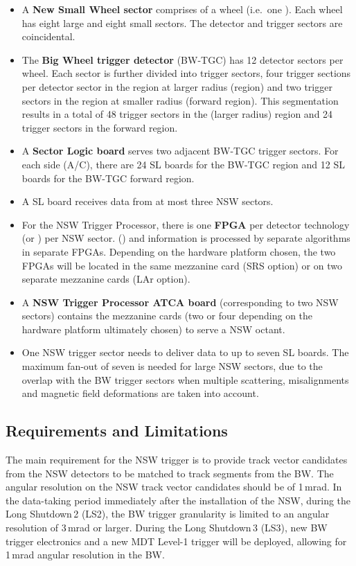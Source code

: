 \begin{itemize}
\item A {\bf New Small Wheel sector} comprises \sector of a wheel (i.e.\ one \endcap). Each wheel has eight large and eight small sectors. The detector and trigger sectors are coincidental.
\item The {\bf Big Wheel trigger detector} (BW-TGC) has 12 detector sectors per wheel.
Each sector is further divided into trigger sectors, four trigger sections per detector sector in the region at larger radius (\endcap region) and two trigger sectors in the region at smaller radius (forward region). This segmentation results in a total of 48 trigger sectors in the \endcap (larger radius) region and 24 trigger sectors in the forward region.
\item A {\bf Sector Logic board} serves two adjacent BW-TGC trigger sectors. For each side (A/C), there are 24 SL boards for the BW-TGC \endcap region and 12 SL boards for the BW-TGC forward region.
\item A SL board receives data from at most three NSW sectors.
\item For the NSW Trigger Processor, there is one {\bf FPGA} per detector technology (\MM or \stgc) per NSW sector. (\MM) and \stgc information is processed by separate algorithms in separate FPGAs. Depending on the hardware platform chosen, the two FPGAs will be located in the same mezzanine card (SRS option) or on two separate mezzanine cards (LAr option).
\item A {\bf NSW Trigger Processor ATCA board} (corresponding to two NSW sectors) contains the mezzanine cards (two or four depending on the hardware platform ultimately chosen) to serve a NSW octant.
\item One NSW trigger sector needs to deliver data to up to seven SL boards. The maximum fan-out of seven is needed for large NSW sectors, due to the overlap with the BW trigger sectors when multiple scattering, misalignments and magnetic field deformations are taken into account.
\end{itemize}


\subsection{Requirements and Limitations}
\label{sec:RequirementLimitations}

The main requirement for the NSW trigger is to provide track vector candidates from the NSW detectors to be matched to track segments from the BW.
The angular resolution on the NSW track vector candidates should be of 1\,mrad. In the data-taking period immediately after the installation of the NSW, during the Long Shutdown\,2 (LS2), the BW trigger granularity is limited to an angular resolution of 3\,mrad or larger. During the Long Shutdown\,3 (LS3), new BW trigger electronics and a new MDT Level-1 trigger will be deployed, allowing for 1\,mrad angular resolution in the BW.

